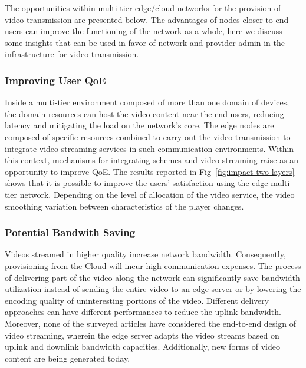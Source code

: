 The opportunities within multi-tier edge/cloud networks for the provision of video transmission are presented below. The advantages of nodes closer to end-users can improve the functioning of the network as a whole, here we discuss some insights that can be used in favor of network and provider admin in the infrastructure for video transmission.

\subsubsection{Improving User QoE}

Inside a multi-tier environment composed of more than one domain of devices, the domain resources can host the video content near the end-users, reducing latency and mitigating the load on the network's core. The edge nodes are composed of specific resources combined to carry out the video transmission to integrate video streaming services in such communication environments. Within this context, mechanisms for integrating schemes and video streaming raise as an opportunity to improve QoE.%
The results reported in Fig~\ref{fig:impact-two-layers} shows that it is possible to improve the users' satisfaction using the edge multi-tier network. Depending on the level of allocation of the video service, the video smoothing variation between characteristics of the player changes.


\subsubsection{Potential Bandwith Saving}

Videos streamed in higher quality increase network bandwidth. Consequently, provisioning from the Cloud will incur high communication expenses. 
The process of delivering part of the video along the network can significantly save bandwidth utilization instead of sending the entire video to an edge server or by lowering the encoding quality of uninteresting portions of the video. Different delivery approaches can have different performances to reduce the uplink bandwidth. Moreover, none of the surveyed articles have considered the end-to-end design of video streaming, wherein the edge server adapts the video streams based on uplink and downlink bandwidth capacities. Additionally, new forms of video content are being generated today.


